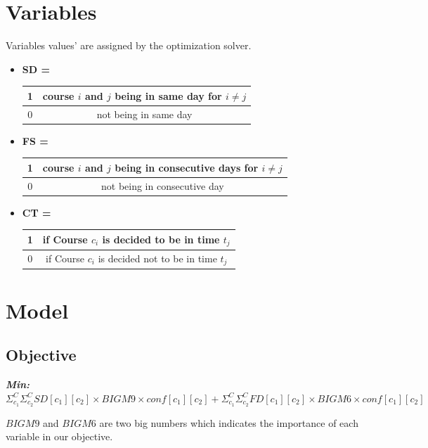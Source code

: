 \documentclass{report}
\begin{document}
\section{Variables}
Variables values' are assigned by the optimization solver.
\begin{itemize}
\item
{\textbf{SD \big[ C \big]\big[ C \big]  \space =}
\begin{tabular}{| c | c |} \hline
1 & course $i$ and $j$ being in same day for $i \neq j$ \\ \hline
0 & not being in same day \\ \hline
\end{tabular}}

\item{
\textbf{FS \big[ C \big]\big[ C \big]  \space =}
\begin{tabular}{| c | c |} \hline
1 & course $i$ and $j$ being in consecutive days for $i \neq j$ \\ \hline
0 & not being in consecutive day \\ \hline
\end{tabular}}

\item{
\textbf{CT \big[ C \big]\big[ T \big]  \space =}
\begin{tabular}{| c | c |} \hline
1 & if Course $c_i$ is decided to be in time $t_j$  \\ \hline
0 & if Course $c_i$ is decided not to be in time $t_j$ \\ \hline
\end{tabular}}


\end{itemize}

\section{Model}
\subsection{Objective}

\textbf{ \textit{Min:} } $\Sigma_{c_1}^{C} \Sigma_{c_2}^{C} SD[c_1][c_2] \times BIGM9 \times conf[c_1][c_2] + \Sigma_{c_1}^{C} \Sigma_{c_2}^{C} FD[c_1][c_2] \times BIGM6 \times conf[c_1][c_2]  $  \newline 

$BIGM9$ and $BIGM6$ are two big numbers which indicates the importance of each variable in our objective.
\end{document}
